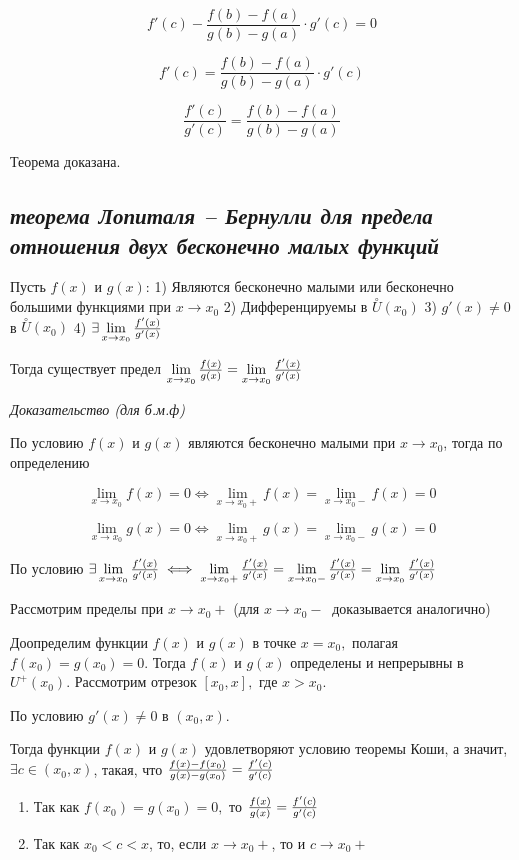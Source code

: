 $$f'(c) - {\frac{f(b) - f(a)}{g(b)-g(a)}}\cdot g'(c) = 0$$

$$f'(c) = {\frac{f(b) - f(a)}{g(b)-g(a)}}\cdot g'(c)$$

$$\frac{f'(c)}{g'(c)}=\frac{f(b) - f(a)}{g(b)-g(a)}$$

Теорема доказана.
\newpage 
\subsection{\textit{теорема Лопиталя – Бернулли для предела отношения двух бесконечно малых функций}}

Пусть $f(x)$ и $g(x)$: 1) Являются бесконечно малыми или бесконечно большими функциями при $x \rightarrow x_0$ 2) Дифференцируемы в $\overset{\circ}U(x_0)$ 3) $g'(x) \neq 0$ в $\overset{\circ}U(x_0)$ 4) $\exists \lim\limits_{x \rightarrow x_0}{\Large\frac{f'(x)}{g'(x)}}$

Тогда существует предел $\lim\limits_{x \rightarrow x_0}{\Large\frac{f(x)}{g(x)}} = \lim\limits_{x \rightarrow x_0}{\Large\frac{f'(x)}{g'(x)}}$

\textit{Доказательство (для б.м.ф)}

По условию $f(x)$ и $g(x)$ являются бесконечно малыми при $x \rightarrow x_0$, тогда по определению

$$\lim\limits_{x \rightarrow x_0}f(x) = 0 \iff \lim\limits_{x \rightarrow x_0+}f(x) = \lim\limits_{x \rightarrow x_0-}f(x) = 0
$$

$$
\lim\limits_{x \rightarrow x_0}g(x) = 0 \iff \lim\limits_{x \rightarrow x_0+}g(x) = \lim\limits_{x \rightarrow x_0-}g(x)=0
$$

По условию $\exists \lim\limits_{x \rightarrow x_0}{\Large\frac{f'(x)}{g'(x)}} \iff \lim\limits_{x \rightarrow x_0+}{\Large\frac{f'(x)}{g'(x)}} = \lim\limits_{x \rightarrow x_0-}{\Large\frac{f'(x)}{g'(x)}} = \lim\limits_{x \rightarrow x_0}{\Large\frac{f'(x)}{g'(x)}}$

Рассмотрим пределы при $x \rightarrow x_0+$ (для $x \rightarrow x_0- \ $ доказывается аналогично)

Доопределим функции $f(x)$ и $g(x)$ в точке $x = x_0,$ полагая $f(x_0) = g(x_0) = 0$. Тогда $f(x)$ и $g(x)$ определены и непрерывны в $U^+(x_0)$. Рассмотрим отрезок $[x_0, x],$ где $x > x_0$.

По условию $g'(x) \neq 0 $ в $(x_0, x)$.

Тогда функции $f(x)$ и $g(x)$ удовлетворяют условию теоремы Коши, а значит, $\exists c \in (x_0, x)$, такая, что ${\Large\frac{f(x) - f(x_0)}{g(x) - g(x_0)}} = {\Large\frac{f'(c)}{g'(c)}}$
\begin{enumerate}

\item Так как $f(x_0) = g(x_0) = 0,$ то ${\Large\frac{f(x)}{g(x)}} = {\Large\frac{f'(c)}{g'(c)}}$
\item Так как $x_0 < c < x$, то, если $x \rightarrow x_0 +$, то и $c \rightarrow x_0+$

\end{enumerate}


